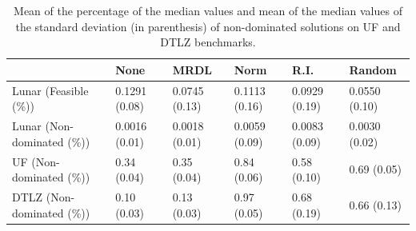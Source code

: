\begin{table}[!t]
	\begin{tabular}{llllll}
		\cline{6-6}
		\hline
		\rowcolor[gray]{.7} \multicolumn{1}{|l|}{\textbf{Proportion}}         & \multicolumn{1}{l|}{None} & \multicolumn{1}{l|}{MRDL} & \multicolumn{1}{l|}{Norm} & \multicolumn{1}{l|}{R.I.} & \multicolumn{1}{l|}{Random} \\ \hline \hline  \hline
		
		Lunar (Feasible (\%))           & 0.1291 (0.08) & 0.0745 (0.13) & 0.1113 (0.16) & 0.0929 (0.19)             & 0.0550 (0.10) \\
		
		\rowcolor[gray]{.95}Lunar (Non-dominated (\%))           & 0.0016 (0.01) &0.0018 (0.01) & 0.0059 (0.09) & 0.0083 (0.09)             & 0.0030 (0.02) \\%
		
		UF (Non-dominated (\%))              & 0.34 (0.04) & 0.35 (0.04) & 0.84 (0.06) & 0.58 (0.10)             & 0.69 (0.05) \\ %
		
		\rowcolor[gray]{.95}DTLZ (Non-dominated (\%))              & 0.10 (0.03) & 0.13 (0.03) & 0.97 (0.05) & 0.68 (0.19)             &  0.66 (0.13) \\ %
		
	\end{tabular}
	\caption{Mean of the percentage of the median values and mean of the median values of the standard deviation (in parenthesis) of non-dominated solutions on UF and DTLZ benchmarks.\\
	}
	\label{minor_results}
\end{table}

